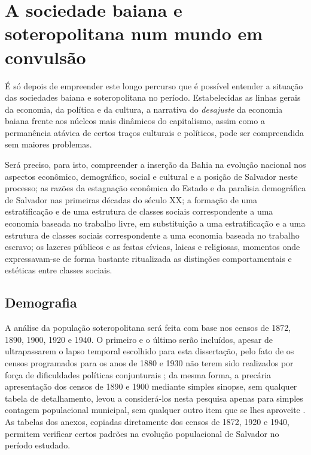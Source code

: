 \section{A sociedade baiana e soteropolitana num mundo em convulsão}\label{sec:sobasotconv}

É só depois de empreender este longo percurso que é possível entender a situação das sociedades baiana e soteropolitana no período. Estabelecidas as linhas gerais da economia, da política e da cultura, a narrativa do \textit{desajuste} da economia baiana frente aos núcleos mais dinâmicos do capitalismo, assim como a permanência atávica de certos traços culturais e políticos, pode ser compreendida sem maiores problemas.

Será preciso, para isto, compreender a inserção da Bahia na evolução nacional nos aspectos econômico, demográfico, social e cultural e a posição de Salvador neste processo; as razões da estagnação econômica do Estado e da paralisia demográfica de Salvador nas primeiras décadas do século XX; a formação de uma estratificação e de uma estrutura de classes sociais correspondente a uma economia baseada no trabalho livre, em substituição a uma estratificação e a uma estrutura de classes sociais correspondente a uma economia baseada no trabalho escravo; os lazeres públicos e as festas cívicas, laicas e religiosas, momentos onde expressavam-se de forma bastante ritualizada as distinções comportamentais e estéticas entre classes sociais.

\subsection{Demografia}\label{subsec:demogbasa}

A análise da população soteropolitana será feita com base nos censos de 1872, 1890, 1900, 1920 e 1940. O primeiro e o último serão incluídos, apesar de ultrapassarem o lapso temporal escolhido para esta dissertação, pelo fato de os censos programados para os anos de 1880 e 1930 não terem sido realizados por força de dificuldades políticas conjunturais \cite{oliveirasimoes_censos_2005}; da mesma forma, a precária apresentação dos censos de 1890 e 1900 mediante simples sinopse, sem qualquer tabela de detalhamento, levou a considerá-los nesta pesquisa apenas para simples contagem populacional municipal, sem qualquer outro item que se lhes aproveite \cite{reisetal_areascensos_2011}. As tabelas dos anexos, copiadas diretamente dos censos de 1872, 1920 e 1940, permitem verificar certos padrões na evolução populacional de Salvador no período estudado.


